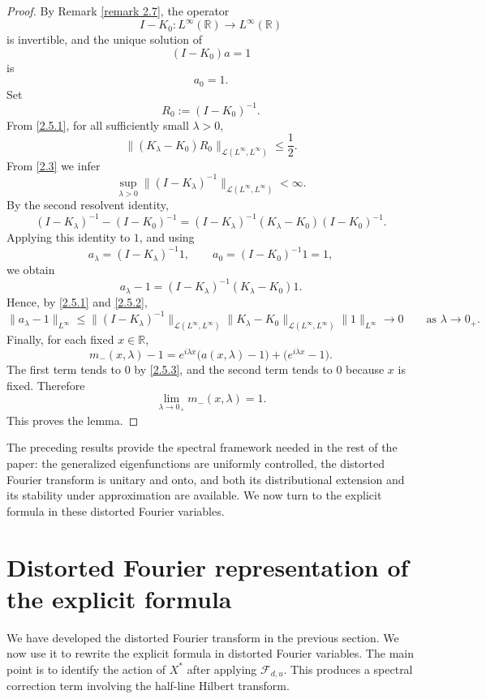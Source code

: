 \documentclass[10pt]{article}
\numberwithin{equation}{section}
\numberwithin{theorem}{section}
\begin{document}
\begin{proof}
By Remark \ref{remark 2.7}, the operator
\[
I-K_0:L^\infty(\mathbb R)\to L^\infty(\mathbb R)
\]
is invertible, and the unique solution of
\[
(I-K_0)a=1
\]
is
\[
a_0=1.
\]
Set
\[
R_0:=(I-K_0)^{-1}.
\]
From \eqref{2.5.1}, for all sufficiently small \(\lambda>0\),
\[
\|(K_\lambda-K_0)R_0\|_{\mathcal L(L^\infty,L^\infty)}
\le \frac12 .
\]
From \eqref{2.3} we infer
\begin{equation}
\label{2.5.2}
\sup_{\lambda>0}
\|(I-K_\lambda)^{-1}\|_{\mathcal L(L^\infty,L^\infty)}
<\infty .
\end{equation}
By the second resolvent identity,
\[
(I-K_\lambda)^{-1}-(I-K_0)^{-1}
=
(I-K_\lambda)^{-1}(K_\lambda-K_0)(I-K_0)^{-1}.
\]
Applying this identity to \(1\), and using
\[
a_\lambda=(I-K_\lambda)^{-1}1,
\qquad
a_0=(I-K_0)^{-1}1=1,
\]
we obtain
\[
a_\lambda-1
=
(I-K_\lambda)^{-1}(K_\lambda-K_0)1.
\]
Hence, by \eqref{2.5.1} and \eqref{2.5.2},
\begin{equation}
\label{2.5.3}
\|a_\lambda-1\|_{L^\infty}
\le
\|(I-K_\lambda)^{-1}\|_{\mathcal L(L^\infty,L^\infty)}
\|K_\lambda-K_0\|_{\mathcal L(L^\infty,L^\infty)}
\|1\|_{L^\infty}  
\longrightarrow0
\qquad\text{as }\lambda\to0_{+}.
\end{equation}
Finally, for each fixed \(x\in\mathbb R\),
\[
m_-(x,\lambda)-1
=
e^{i\lambda x}\bigl(a(x,\lambda)-1\bigr)
+
\bigl(e^{i\lambda x}-1\bigr).
\]
The first term tends to \(0\) by \eqref{2.5.3}, and the second term tends to \(0\)
because \(x\) is fixed. Therefore
\[
\lim_{\lambda\to0_{+}}m_-(x,\lambda)=1.
\]
This proves the lemma.
\end{proof}
The preceding results provide the spectral framework needed in the rest of the paper:
the generalized eigenfunctions are uniformly controlled, the distorted Fourier transform
is unitary and onto, and both its distributional extension and its stability under
approximation are available. We now turn to the explicit formula in these distorted
Fourier variables.
\section{Distorted Fourier representation of the explicit formula}
\label{section 2.3}

We have developed the distorted Fourier transform in the previous section. We now use it
to rewrite the explicit formula in distorted Fourier variables. The main point is to
identify the action of \(X^*\) after applying \(\mathcal F_{d,u}\). This produces a
spectral correction term involving the half-line Hilbert transform.
\end{document}

